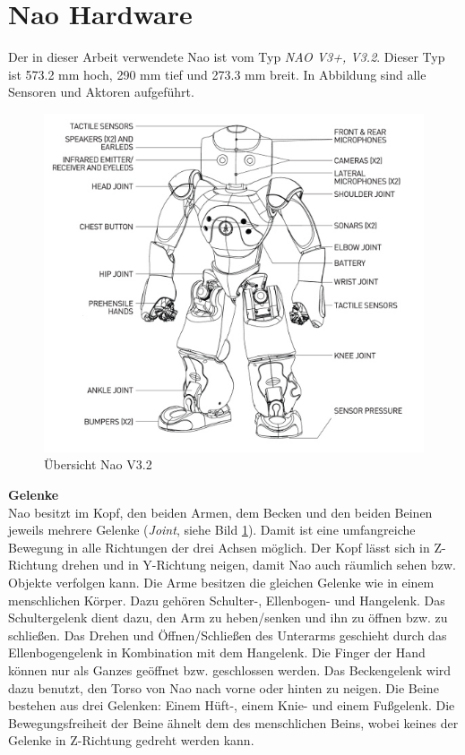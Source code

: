 \section{Nao Hardware}
\label{nao:hardware}
Der in dieser Arbeit verwendete Nao ist vom Typ \textit{NAO V3+, V3.2}. Dieser Typ ist 573.2 mm hoch, 290 mm tief und 273.3 mm breit. In Abbildung  sind alle Sensoren und Aktoren aufgeführt.
\\
\begin{figure}[H]						
	\centering							
	\includegraphics[scale=0.9]{Bilder/nao_overview.jpg}			
	\caption{Übersicht Nao V3.2}						
	\label{f:nao_ov}						
\end{figure}
\noindent
\textbf{Gelenke}
\\
Nao besitzt  im Kopf, den beiden Armen, dem Becken und den beiden Beinen jeweils mehrere Gelenke (\textit{Joint}, siehe Bild \ref{f:nao_ov}). Damit ist eine umfangreiche Bewegung in alle Richtungen der drei Achsen möglich. Der Kopf lässt sich in Z-Richtung drehen und in Y-Richtung neigen, damit Nao auch räumlich sehen bzw. Objekte verfolgen kann.
Die Arme besitzen die gleichen Gelenke wie in einem menschlichen Körper. Dazu gehören Schulter-, Ellenbogen- und Hangelenk. Das Schultergelenk dient dazu, den Arm zu heben/senken und ihn zu öffnen bzw. zu schließen. Das Drehen und Öffnen/Schließen des Unterarms geschieht durch das Ellenbogengelenk in Kombination mit dem Hangelenk. Die Finger der Hand können nur als Ganzes geöffnet bzw. geschlossen werden.
Das Beckengelenk wird dazu benutzt, den Torso von Nao nach vorne oder hinten zu neigen.
Die Beine bestehen aus drei Gelenken: Einem Hüft-, einem Knie- und einem Fußgelenk. Die Bewegungsfreiheit der Beine ähnelt dem des menschlichen Beins, wobei keines der Gelenke in Z-Richtung gedreht werden kann.


